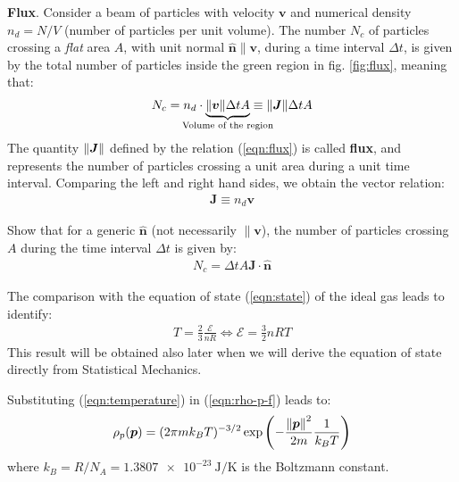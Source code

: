 \documentclass[../../main.tex]{subfiles}
\begin{document}
\begin{appr}\textbf{Flux}. Consider a beam of particles with velocity $\bm{v}$ and numerical density $n_d = N/V$ (number of particles per unit volume). The number $N_c$ of particles crossing a \textit{flat} area $A$, with unit normal $\bm{\hat{n}} \parallel \bm{v}$, during a time interval $\Delta t$, is given by the total number of particles inside the green region in fig. \ref{fig:flux}, meaning that:
\begin{align}\label{eqn:flux}
    N_c = n_d \cdot \underbrace{\norm{\bm{v}} \Delta t A}_{\mathclap{\text{Volume of the region}}}  \equiv \norm{\bm{J}} \Delta t A
\end{align}   
The quantity $\norm{\bm{J}}$ defined by the relation (\ref{eqn:flux}) is called \textbf{flux}, and represents the number of particles crossing a unit area during a unit time interval. Comparing the left and right hand sides, we obtain the vector relation:
\begin{align*}
    \bm{J} \equiv n_d \bm{v}
\end{align*}
\end{appr}



\begin{exo} \label{exo:flux}
    Show that for a generic $\bm{\hat{n}}$ (not necessarily $\parallel \bm{v}$), the number of particles crossing $A$ during the time interval $\Delta t$ is given by:
    \begin{align*}
        N_c = \Delta t A \bm{J}\cdot \bm{\hat{n}}
    \end{align*} 
\end{exo}

The comparison with the equation of state (\ref{eqn:state}) of the ideal gas leads to identify:
    \begin{align}\label{eqn:temperature}
        T = \frac{2}{3} \frac{\mathcal{E}}{n R} \Leftrightarrow \mathcal{E}= \frac{3}{2} n R T   
    \end{align}
This result will be obtained also later when we will derive the equation of state directly from Statistical Mechanics.

\medskip

Substituting (\ref{eqn:temperature}) in (\ref{eqn:rho-p-f}) leads to:
\begin{align*}
    \rho_p(\bm{p}) = (2 \pi m k_B T)^{-3/2} \exp\left(-\frac{\norm{\bm{p}}^2}{2m} \frac{1}{k_B T}  \right)
\end{align*}
where $k_B = R/N_A = \SI{1.3807e-23}{\J\per\K}$ is the Boltzmann constant. 
\end{document}
